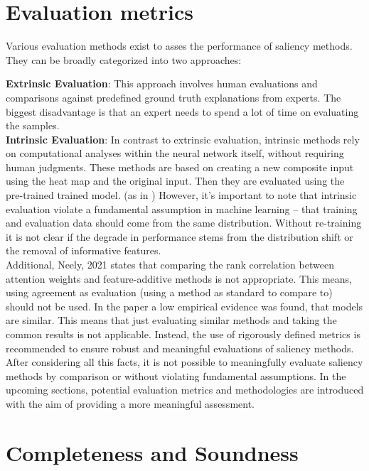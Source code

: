 \section{Evaluation metrics \cite{gupta2022new}}

Various evaluation methods exist to asses the performance of saliency methods. They can be broadly categorized into two approaches:


\textbf{Extrinsic Evaluation\cite{gupta2022new}}:
 This approach involves human evaluations and comparisons against predefined ground truth explanations from experts.\cite{zhang2018} The biggest disadvantage is that an expert needs to spend a lot of time on evaluating the samples.
\\
\textbf{Intrinsic Evaluation}: 
In contrast to extrinsic evaluation, intrinsic methods rely on computational analyses within the neural network itself, without requiring human judgments. These methods are based on creating a new composite input using the heat map and the original input. Then they are evaluated using the pre-trained trained model. (as in \cite{dabkowski2017real}) However, it's important to note that intrinsic evaluation violate a fundamental assumption in machine learning – that training and evaluation data should come from the same distribution.  Without re-training it is not clear if the degrade in performance stems from the distribution shift or the removal of informative features. \cite{hooker2019benchmark}
\\
Additional, Neely, 2021\cite{neely2021order} states that comparing the rank correlation between attention weights and feature-additive methods is not appropriate. This means, using agreement as evaluation (using a method as standard to compare to) should not be used. In the paper a low empirical evidence was found, that models are similar. This means that just evaluating similar methods and taking the common results is not applicable.  Instead, the use of rigorously defined metrics is recommended to ensure robust and meaningful evaluations of saliency methods.
\\
After considering all this facts, it is not possible to meaningfully evaluate saliency methods by comparison or without violating fundamental assumptions.  In the upcoming sections, potential evaluation metrics and methodologies are introduced with the aim of providing a more meaningful assessment.

\section{Completeness and Soundness}

